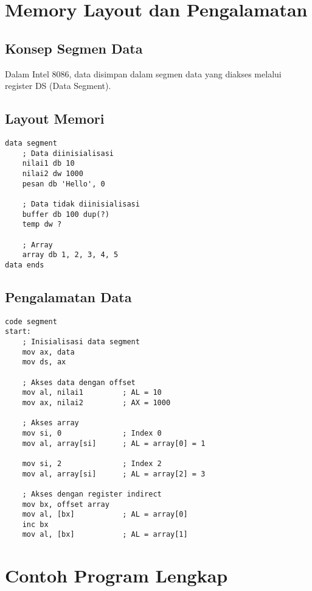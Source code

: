 \documentclass[../main.tex]{subfiles}
\begin{document}
\section{Memory Layout dan Pengalamatan}

\subsection{Konsep Segmen Data}
Dalam Intel 8086, data disimpan dalam segmen data yang diakses melalui register DS (Data Segment).

\subsection{Layout Memori}
\begin{lstlisting}[language={[x86masm]Assembler}, caption=Layout Memori Data, label={lst:memory-layout}]
data segment
    ; Data diinisialisasi
    nilai1 db 10
    nilai2 dw 1000
    pesan db 'Hello', 0
    
    ; Data tidak diinisialisasi
    buffer db 100 dup(?)
    temp dw ?
    
    ; Array
    array db 1, 2, 3, 4, 5
data ends
\end{lstlisting}

\subsection{Pengalamatan Data}
\begin{lstlisting}[language={[x86masm]Assembler}, caption=Pengalamatan Data, label={lst:data-addressing}]
code segment
start:
    ; Inisialisasi data segment
    mov ax, data
    mov ds, ax
    
    ; Akses data dengan offset
    mov al, nilai1         ; AL = 10
    mov ax, nilai2         ; AX = 1000
    
    ; Akses array
    mov si, 0              ; Index 0
    mov al, array[si]      ; AL = array[0] = 1
    
    mov si, 2              ; Index 2
    mov al, array[si]      ; AL = array[2] = 3
    
    ; Akses dengan register indirect
    mov bx, offset array
    mov al, [bx]           ; AL = array[0]
    inc bx
    mov al, [bx]           ; AL = array[1]
\end{lstlisting}

\section{Contoh Program Lengkap}
\end{document}
